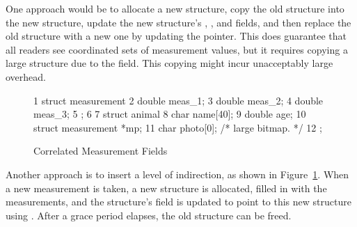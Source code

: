 One approach would be to allocate a new  structure,
copy the old structure into the new structure, update the new
structure's , , and  fields,
and then replace the old structure with a new one by updating
the pointer.
This does guarantee that all readers see coordinated sets of
measurement values, but it requires copying a large structure due
to the  field.
This copying might incur unacceptably large overhead.

\begin{figure}[tbp]
{ \scriptsize
\begin{verbbox}
 1 struct measurement {
 2   double meas_1;
 3   double meas_2;
 4   double meas_3;
 5 };
 6 
 7 struct animal {
 8   char name[40];
 9   double age;
10   struct measurement *mp;
11   char photo[0]; /* large bitmap. */
12 };
\end{verbbox}
}
\centering
\theverbbox
\caption{Correlated Measurement Fields}
\label{fig:together:Correlated Measurement Fields}
\end{figure}

Another approach is to insert a level of indirection, as shown in
Figure~\ref{fig:together:Correlated Measurement Fields}.
When a new measurement is taken, a new  structure
is allocated, filled in with the measurements, and the 
structure's  field is updated to point to this new
 structure using .
After a grace period elapses, the old  structure
can be freed.

